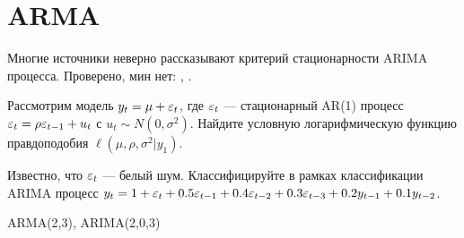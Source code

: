 
\chapter{ARMA}

Многие источники неверно рассказывают критерий стационарности ARIMA процесса. 
Проверено, мин нет: \cite{van2010time}, \cite{tsay2005analysis}.


\begin{problem}
Рассмотрим модель $y_t=\mu + \varepsilon_t$, где $\varepsilon_t$ — стационарный AR(1) процесс $\varepsilon_t=\rho \varepsilon_{t-1} + u_t$ с $u_t \sim N(0,\sigma^2)$. Найдите условную логарифмическую функцию правдоподобия $\ell(\mu, \rho, \sigma^2 | y_1)$.
\begin{sol}

\end{sol}
\end{problem}

\begin{problem}
Известно, что $\varepsilon_t$ — белый шум. Классифицируйте в рамках классификации ARIMA процесс $y_t=1+\varepsilon_t + 0.5\varepsilon_{t-1} + 0.4\varepsilon_{t-2} + 0.3\varepsilon_{t-3} + 0.2y_{t-1} + 0.1y_{t-2}$.
\begin{sol}

ARMA(2,3), ARIMA(2,0,3)
\end{sol}
\end{problem}


